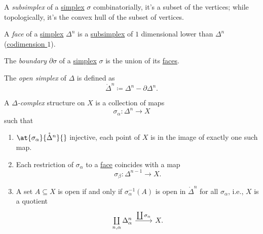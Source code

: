 \begin{definition}[Subsimplex]\label{def:subsimplex}
	A \emph{subsimplex} of a \hyperref[def:standard-simplex]{simplex} \(\sigma \) combinatorially, it's a
	subset of the vertices; while topologically, it's the convex hull of the subset of vertices.
	\begin{figure}[H]
		\centering
		\label{fig:def:subsimplex}
	\end{figure}
\end{definition}

\begin{definition}[Face]\label{def:face}
	A \emph{face} of a \hyperref[def:standard-simplex]{simplex} \(\Delta ^n\) is a \hyperref[def:subsimplex]{subsimplex} of \(1\) dimensional lower
	than \(\Delta ^n\) (\underline{codimension \(1\)}).
\end{definition}

\begin{definition}[Boundary]\label{def:boundary}
	The \emph{boundary} \(\partial \sigma \) of a \hyperref[def:standard-simplex]{simplex} \(\sigma \) is the union of its \hyperref[def:face]{faces}.
\end{definition}

\begin{definition}\label{def:open-simplex}
	The \emph{open simplex} of \(\Delta \) is defined as
	\[
		\mathring{\Delta}^n \coloneqq \Delta^n - \partial \Delta^n.
	\]
\end{definition}

\begin{definition}\label{def:delta-complex}
	A \emph{\(\Delta \)-complex} structure on \(X\) is a collection of maps
	\[
		\sigma _\alpha \colon \Delta ^n\to X
	\]
	such that
	\begin{enumerate}
		\item \(\at{\sigma _\alpha }{\mathring{\Delta}^n}{}\) injective, each point of \(X\) is in the image of exactly one such map.
		\item Each restriction of \(\sigma _\alpha \) to a \hyperref[def:face]{face} coincides with a map
		      \[
			      \sigma _\beta \colon \Delta^{n-1} \to X.
		      \]
		\item A set \(A\subseteq X\) is open if and only if \(\sigma ^{-1} _\alpha (A)\) is open in \(\mathring{\Delta }^n\) for all
		      \(\sigma _\alpha \), i.e., \(X\) is a quotient
		      \[
			      \begin{tikzcd}
				      {\coprod\limits_{n, \alpha }\Delta ^n_\alpha} & {X.}
				      \arrow["{\coprod \sigma _\alpha}", from=1-1, to=1-2]
			      \end{tikzcd}
		      \]
	\end{enumerate}
\end{definition}


